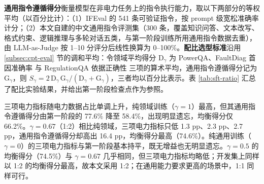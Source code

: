 \documentclass[fontset=fandol,type=master,campus=shenzhen,etitleauto=true]{hithesisbook}
\begin{document}
\textbf{通用指令遵循得分}衡量模型在非电力任务上的指令执行能力，取以下两部分的等权平均（以百分比计）：（1）IFEval\cite{ref85} 的 541 条可验证指令，按 prompt 级宽松准确率计分；（2）本文自建的中文通用指令评测集（300 条，覆盖知识问答、文本改写、格式约束、逻辑推理与多轮对话五类，与第一阶段训练所用通用指令数据去重），由 LLM-as-Judge 按 1--10 分评分后线性换算为 0--100\%。\textbf{配比选型标准}沿用 \ref{subsec:cpt-eval} 节的调和平均：令领域平均得分 $\text{D}_\gamma$ 为 PowerQA、FaultDiag 首因准确率 与 RegulationQA 依据正确性 三项的算术平均，通用指令遵循得分记为 $\text{G}_\gamma$，则 $S_\gamma = 2\,\text{D}_\gamma\,\text{G}_\gamma / (\text{D}_\gamma + \text{G}_\gamma)$，三者均以百分比表示。表 \ref{tab:sft-ratio} 汇总了配比实验结果，并给出第一阶段检查点作为参照。

\begin{table}[htbp]
\centering
\caption{SFT 第二阶段通用-领域数据配比实验结果}
\label{tab:sft-ratio}
\small
\setlength{\tabcolsep}{4pt}
\end{table}

三项电力指标随电力数据占比单调上升，纯领域训练（$\gamma = 1$）最高，但其通用指令遵循得分由第一阶段的 77.6\% 降至 58.4\%，出现明显遗忘，均衡得分仅 66.2\%。$\gamma = 0.67$（1:2）相比纯领域，三项电力指标只低 1.3 pp、2.3 pp、2.7 pp，通用指令遵循得分却高出 16.4 pp，均衡得分最高（74.6\%）。纯通用训练（$\gamma = 0$）的三项电力指标与第一阶段基本持平，既无增益也无明显遗忘。$\gamma = 0.5$ 的均衡得分（74.5\%）与 $\gamma = 0.67$ 几乎相同，但三项电力指标均略低；开发集上同样以 1:2 的均衡得分最高，故本文采用 1:2；在通用能力要求更高的场景中，1:1 同样可行。
\end{document}
